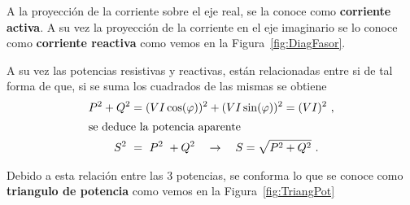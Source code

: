             A la proyección de la corriente sobre el eje real, se la conoce como 
            \textbf{corriente activa}. A su vez la proyección de la corriente en el eje 
            imaginario se lo conoce como \textbf{corriente reactiva} como vemos en la 
            Figura~\ref{fig:DiagFasor}. 

            A su vez las potencias resistivas y reactivas, están relacionadas entre si de 
            tal forma de que, si se suma los cuadrados de las mismas se obtiene
               \begin{align}
                     P^{2} + Q^{2} &=  (V I \cos(\varphi))^{2} + (V I \sin(\varphi))^{2} = (V I)^{2} \ , \notag \\
                  \intertext{se deduce la potencia aparente}
                     S^{2}\ &=\ P^{2}\ + Q^{2} \hspace{10pt} \rightarrow \hspace{10pt} S = \sqrt{P^{2} + Q^{2}} \ . \notag
               \end{align}
            
            Debido a esta relación entre las 3 potencias, se conforma lo que se conoce como 
            \textbf{triangulo de potencia} como vemos en la Figura~\ref{fig:TriangPot}


